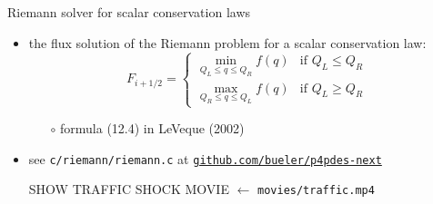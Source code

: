 \documentclass[10pt,dvipsnames,usepdftitle=false,
hyperref={pdftitle = {Finite volume methods},
    pdfauthor = {Ed Bueler}}]{beamer}
\begin{document}
\begin{frame}{Riemann solver for scalar conservation laws}

\begin{itemize}
\item the flux solution of the Riemann problem for a scalar conservation law:
    $$F_{i+1/2} = \begin{cases} {\displaystyle \min_{Q_L \le q \le Q_R} f(q)} & \text{if } Q_L \le Q_R \\ {\displaystyle \max_{Q_R \le q \le Q_L} f(q)} & \text{if } Q_L \ge Q_R \end{cases}$$

    \begin{itemize}
    \item[$\circ$] formula (12.4) in LeVeque (2002)
    \end{itemize}
\item see \texttt{c/riemann/riemann.c} at \href{https://github.com/bueler/p4pdes-next}{\texttt{github.com/bueler/p4pdes-next}}

\vspace{10mm}
\begin{center}
\alert{SHOW TRAFFIC SHOCK MOVIE}  \qquad $\leftarrow$ \texttt{movies/traffic.mp4}
\end{center}
\end{itemize}

\end{frame}
\end{document}
